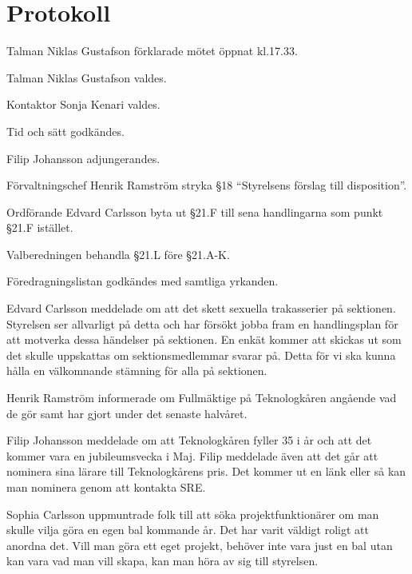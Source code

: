 \documentclass[10pt]{article}
\def\mo{Niklas Gustafson}
\def\ms{Sonja Kenari}
\begin{document}
\section*{Protokoll}
\begin{paragrafer}
Talman {\mo} förklarade mötet öppnat kl.17.33.

Talman {\mo} valdes.

Kontaktor {\ms} valdes.

Tid och sätt godkändes.

\valavj

Filip Johansson adjungerandes.



Förvaltningschef Henrik Ramström \ypa stryka \S18 ``Styrelsens förslag till disposition''.

Ordförande Edvard Carlsson \ypa byta ut \S21.F till sena handlingarna
 som punkt \S21.F istället.

Valberedningen \ypa behandla \S21.L före \S21.A-K.

Föredragningslistan godkändes med samtliga yrkanden.


Edvard Carlsson meddelade om att det skett sexuella trakasserier på sektionen.
Styrelsen ser allvarligt på detta och har försökt jobba fram en handlingsplan för att motverka dessa händelser på sektionen.
En enkät kommer att skickas ut som det skulle uppskattas om sektionsmedlemmar svarar på. Detta för vi ska kunna hålla en välkomnande stämning för alla på sektionen.

Henrik Ramström informerade om Fullmäktige på Teknologkåren angående vad de gör samt har gjort under det senaste halvåret.

Filip Johansson meddelade om att Teknologkåren fyller 35 i år och att det kommer vara en jubileumsvecka i Maj. Filip meddelade även att 
det går att nominera sina lärare till Teknologkårens pris. Det kommer ut en länk eller så kan man nominera genom att kontakta SRE. 

Sophia Carlsson uppmuntrade folk till att söka projektfunktionärer om man skulle vilja göra en egen bal kommande år.
Det har varit väldigt roligt att anordna det. Vill man göra ett eget projekt, behöver inte vara just en bal utan kan vara vad man vill skapa, kan man höra av sig till styrelsen.



\end{paragrafer}
\end{document}
